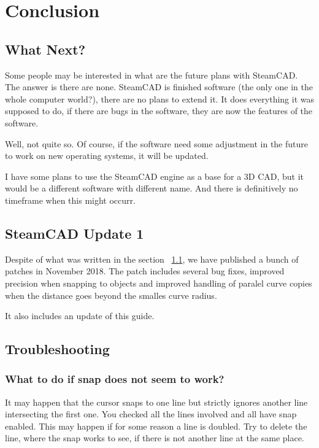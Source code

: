 \chapter{Conclusion}\label{chap:chap6}

\section{What Next?}\label{sec:next}

Some people may be interested in what are the future plans with SteamCAD. The answer is
there are none. SteamCAD is finished software (the only one in the whole computer world?),
there are no plans to extend it. It does everything it was supposed to do, if there are
bugs in the software, they are now the features of the software.

Well, not quite so. Of course, if the software need some adjustment in the future to
work on new operating systems, it will be updated.

I have some plans to use the SteamCAD engine as a base for a 3D CAD, but it would be
a different software with different name. And there is definitively no timeframe when this
might occurr.

\section{SteamCAD Update 1}
Despite of what was written in the section ~\ref{sec:next}, we have published a bunch of
patches in November 2018. The patch includes several bug fixes, improved precision when
snapping to objects and improved handling of paralel curve copies when the distance goes
beyond the smalles curve radius.

It also includes an update of this guide.

\section{Troubleshooting}

\subsection{What to do if snap does not seem to work?}
It may happen that the cursor snaps to one line but strictly ignores another line
intersecting the first one. You checked all the lines involved and all have snap enabled.
This may happen if for some reason a line is doubled. Try to delete the line, where the
snap works to see, if there is not another line at the same place.

